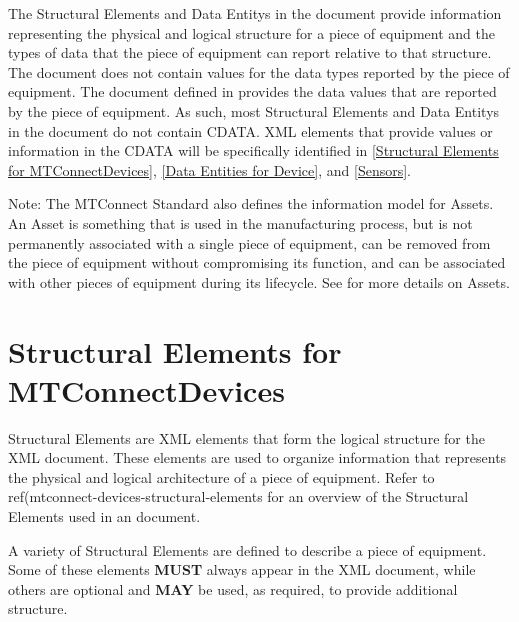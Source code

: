 The \glspl{Structural Element} and \glspl{Data Entity} in the  document provide information representing the physical and logical structure for a piece of equipment and the types of data that the piece of equipment can report relative to that structure.   The  document does not contain values for the data types reported by the piece of equipment.  The  document defined in  provides the data values that are reported by the piece of equipment.   As such, most \glspl{Structural Element} and \glspl{Data Entity} in the  document do not contain \gls{CDATA}.  \gls{XML} elements that provide values or information in the \gls{CDATA} will be specifically identified in \ref{Structural Elements for MTConnectDevices}, \ref{Data Entities for Device}, and \ref{Sensors}.

\begin{note}
Note:  The \gls{MTConnect Standard} also defines the information model for \glspl{Asset}.  An \gls{Asset} is something that is used in the manufacturing process, but is not permanently associated with a single piece of equipment, can be removed from the piece of equipment without compromising its function, and can be associated with other pieces of equipment during its lifecycle.  See  for more details on \glspl{Asset}.

\end{note}

\section{Structural Elements for MTConnectDevices}
\label{sec:Structural Elements for MTConnectDevices}

\glspl{Structural Element} are \gls{XML} elements that form the logical structure for the  \gls{XML} document.  These elements are used to organize information that represents the physical and logical architecture of a piece of equipment.  Refer to {{ref(mtconnect-devices-structural-elements}} for an overview of the \glspl{Structural Element} used in an  document.

A variety of \glspl{Structural Element} are defined to describe a piece of equipment.  Some of these elements \textbf{MUST} always appear in the  \gls{XML} document, while others are optional and \textbf{MAY} be used, as required, to provide additional structure.

